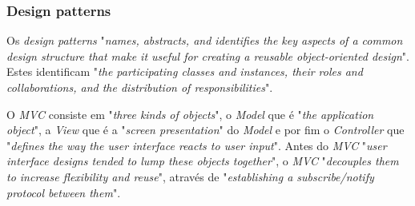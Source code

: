   \subsubsection{Design patterns}
Os \textit{design patterns} "\emph{names, abstracts, and identifies the key aspects of a common design structure that make it useful for creating a reusable object-oriented design}"\citep{dart}. Estes identificam "\emph{the participating classes and instances, their roles and collaborations, and the distribution of responsibilities}"\citep{dart}.

O \textit{MVC} consiste em "\emph{three kinds of objects}"\citep{dart}, o \textit{Model} que é "\emph{the application object}"\citep{dart}, a \textit{View} que é a "\emph{screen presentation}"\citep{dart} do \textit{Model} e por fim o \textit{Controller} que "\emph{defines the way the user interface reacts to user input}"\citep{dart}. Antes do \textit{MVC} "\emph{user interface designs tended to lump these objects together}"\citep{dart}, o \textit{MVC} "\emph{decouples them to increase flexibility  and reuse}"\citep{dart}, através de "\emph{establishing a subscribe/notify  protocol between them}"\citep{dart}.